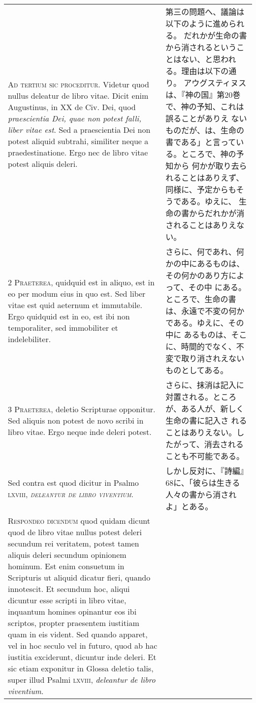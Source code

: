 \documentclass[10pt]{jsarticle} %
\begin{document}
\begin{longtable}{p{21em}p{21em}}


{\Huge A}{\scshape d tertium sic proceditur}. Videtur quod
nullus deleatur de libro vitae. Dicit enim Augustinus, in XX de
Civ. Dei, quod {\itshape praescientia Dei, quae non potest falli, liber vitae
est}. Sed a praescientia Dei non potest aliquid subtrahi, similiter neque
a praedestinatione. Ergo nec de libro vitae potest aliquis deleri.


&

第三の問題へ、議論は以下のように進められる。
だれかが生命の書から消されるということはない、と思われる。理由は以下の通
 り。
アウグスティヌスは、『神の国』第20巻で、神の予知、これは誤ることがありえ
 ないものだが、は、生命の書である」と言っている。ところで、神の予知から
 何かが取り去られることはありえず、同様に、予定からもそうである。ゆえに、
 生命の書からだれかが消されることはありえない。


\\


{\scshape 2 Praeterea}, quidquid est in aliquo, est in
eo per modum eius in quo est. Sed liber vitae est quid aeternum et
immutabile. Ergo quidquid est in eo, est ibi non temporaliter, sed
immobiliter et indelebiliter.


&

さらに、何であれ、何かの中にあるものは、その何かのあり方によって、その中
 にある。ところで、生命の書は、永遠で不変の何かである。ゆえに、その中に
 あるものは、そこに、時間的でなく、不変で取り消されえないものとしてある。

\\


{\scshape 3 Praeterea}, deletio Scripturae
opponitur. Sed aliquis non potest de novo scribi in libro vitae. Ergo
neque inde deleri potest.

&

さらに、抹消は記入に対置される。ところが、ある人が、新しく生命の書に記入さ
 れることはありえない。したがって、消去されることも不可能である。


\\


Sed contra est quod dicitur in Psalmo
\scshape{lxviii}, {\itshape deleantur de libro viventium}.


&

しかし反対に、『詩編』68に、「彼らは生きる人々の書から消されよ」とある。

\\


{\scshape Respondeo dicendum} quod quidam dicunt quod de
libro vitae nullus potest deleri secundum rei veritatem, potest tamen
aliquis deleri secundum opinionem hominum. Est enim consuetum in
Scripturis ut aliquid dicatur fieri, quando innotescit. Et secundum hoc,
aliqui dicuntur esse scripti in libro vitae, inquantum homines opinantur
eos ibi scriptos, propter praesentem iustitiam quam in eis vident. Sed
quando apparet, vel in hoc seculo vel in futuro, quod ab hac iustitia
exciderunt, dicuntur inde deleri. 
Et sic etiam exponitur in Glossa
deletio talis, super illud Psalmi {\scshape lxviii}, {\itshape deleantur de libro
viventium}.


\end{longtable}
\end{document}
